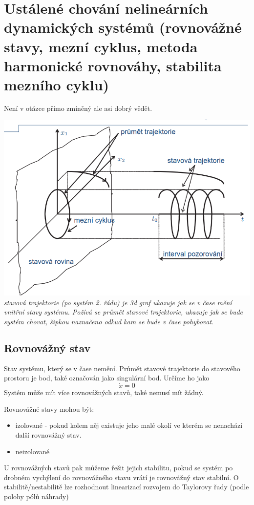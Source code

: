 \section{Ustálené chování nelineárních dynamických systémů (rovnovážné stavy, mezní cyklus, metoda
  harmonické rovnováhy, stabilita mezního cyklu)}

Není v otázce přímo zmíněný ale asi dobrý vědět.

\includegraphics[scale = 0.8]{img/trajektorie.png}
{
    \it stavová trajektorie (po systém 2. řádu) je 3d graf ukazuje jak se v čase mění vnitřní stavy systému.
    Požívá se průmět stavové trajektorie, ukazuje jak se bude systém chovat, šipkou naznačeno odkud kam se bude v čase pohybovat.
}
\subsection{Rovnovážný stav}
Stav systému, který se v čase nemění. Průmět stavové trajektorie do stavového prostoru je bod, také označován jako singulární bod. Určíme
ho jako \[ \dot{x} = 0 \]
Systém může mít více rovnovážných stavů, také nemusí mít žádný.

Rovnovážné stavy mohou být:
\begin{itemize}
    \item izolované - pokud kolem něj existuje jeho malé okolí ve kterém se nenachází další rovnovážný stav.
    \item neizolované
\end{itemize}

U rovnovážných stavů pak můžeme řešit jejich stabilitu, pokud se systém po drobném vychýlení do rovnovážného stavu vrátí je rovnovážný stav stabilní. O stabilitě/nestabilitě lze rozhodnout linearizací rozvojem do Taylorovy řady (podle polohy pólů náhrady)

